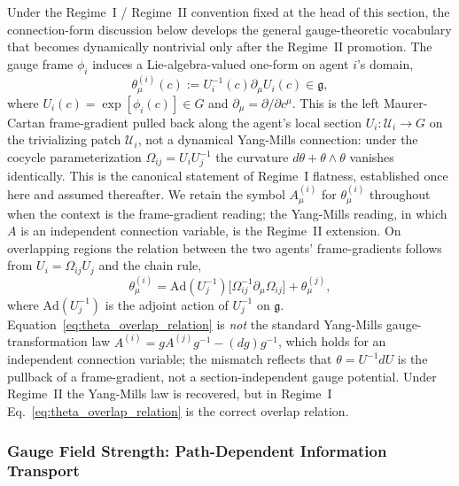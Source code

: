 \documentclass[11pt]{article}
\begin{document}
Under the Regime~I / Regime~II convention fixed at the head of this section, the connection-form discussion below develops the general gauge-theoretic vocabulary that becomes dynamically nontrivial only after the Regime~II promotion. The gauge frame $\phi_i$ induces a Lie-algebra-valued one-form on agent $i$'s domain,
\begin{equation}
\theta^{(i)}_\mu(c) := U_i^{-1}(c) \partial_\mu U_i(c) \in \mathfrak{g},
\label{eq:connection_form}
\end{equation}
where $U_i(c) = \exp[\phi_i(c)] \in G$ and $\partial_\mu = \partial/\partial c^\mu$. This is the left Maurer-Cartan frame-gradient pulled back along the agent's local section $U_i: \mathcal{U}_i \to G$ on the trivializing patch $\mathcal{U}_i$, not a dynamical Yang-Mills connection: under the cocycle parameterization $\Omega_{ij} = U_i U_j^{-1}$ the curvature $d\theta + \theta \wedge \theta$ vanishes identically. This is the canonical statement of Regime~I flatness, established once here and assumed thereafter. We retain the symbol $A^{(i)}_\mu$ for $\theta^{(i)}_\mu$ throughout when the context is the frame-gradient reading; the Yang-Mills reading, in which $A$ is an independent connection variable, is the Regime~II extension. On overlapping regions the relation between the two agents' frame-gradients follows from $U_i = \Omega_{ij} U_j$ and the chain rule,
\begin{equation}
\theta^{(i)}_\mu = \mathrm{Ad}(U_j^{-1})\big[\Omega_{ij}^{-1} \partial_\mu \Omega_{ij}\big] + \theta^{(j)}_\mu,
\label{eq:theta_overlap_relation}
\end{equation}
where $\mathrm{Ad}(U_j^{-1})$ is the adjoint action of $U_j^{-1}$ on $\mathfrak{g}$. Equation~\eqref{eq:theta_overlap_relation} is \emph{not} the standard Yang-Mills gauge-transformation law $A^{(i)} = g A^{(j)} g^{-1} - (dg) g^{-1}$, which holds for an independent connection variable; the mismatch reflects that $\theta = U^{-1}dU$ is the pullback of a frame-gradient, not a section-independent gauge potential. Under Regime~II the Yang-Mills law is recovered, but in Regime~I Eq.~\eqref{eq:theta_overlap_relation} is the correct overlap relation.

\subsubsection{Gauge Field Strength: Path-Dependent Information Transport}
\label{sec:field_strength}
\end{document}
